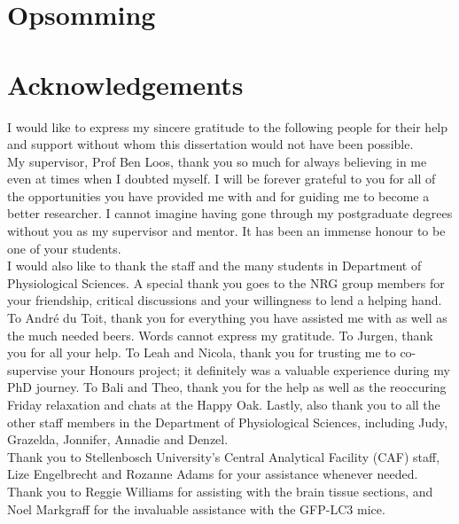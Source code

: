 \chapter{Opsomming}
\newpage

\chapter{Acknowledgements}

\noindent
I would like to express my sincere gratitude to the following people for their help and support without whom this dissertation would not
have been possible. \\

\noindent
My supervisor, Prof Ben Loos, thank you so much for always believing in me even at times when I doubted myself. I will be forever grateful to you for all of the opportunities you have provided me with and for guiding me to become a better researcher. I cannot imagine having gone through my postgraduate degrees without you as my supervisor and mentor. It has been an immense honour to be one of your students. \\

\noindent
I would also like to thank the staff and the many students in Department of Physiological Sciences. A special thank you goes to the NRG group members for your friendship, critical discussions and your willingness to lend a helping hand. To Andr{\'e} du Toit, thank you for everything you have assisted me with as well as the much needed beers. Words cannot express my gratitude. To Jurgen, thank you for all your help. To Leah and Nicola, thank you for trusting me to co-supervise your Honours project; it definitely was a valuable experience during my PhD journey. To Bali and Theo, thank you for the help as well as the reoccuring Friday relaxation and chats at the Happy Oak. Lastly, also thank you to all the other staff members in the Department of Physiological Sciences, including Judy, Grazelda, Jonnifer, Annadie and Denzel. \\

\noindent
Thank you to Stellenbosch University’s Central Analytical Facility (CAF) staff, Lize Engelbrecht and Rozanne Adams for your assistance whenever needed.  Thank you to Reggie Williams for assisting with the brain tissue sections, and Noel Markgraff for the invaluable assistance with the GFP-LC3 mice. \\


